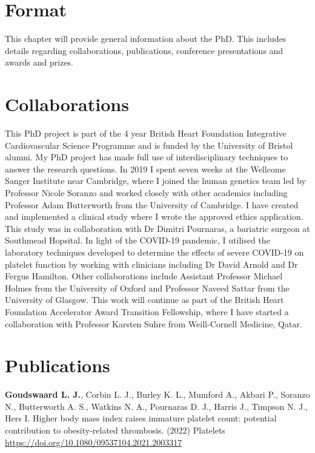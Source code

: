 \documentclass[11pt,twoside]{bristolthesis}
\begin{document}
\hypertarget{format}{%
\section{Format}\label{format}}

This chapter will provide general information about the PhD. This includes details regarding collaborations, publications, conference presentations and awards and prizes.

\hypertarget{collaborations}{%
\section{Collaborations}\label{collaborations}}

This PhD project is part of the 4 year British Heart Foundation Integrative Cardiovascular Science Programme and is funded by the University of Bristol alumni. My PhD project has made full use of interdisciplinary techniques to answer the research questions. In 2019 I spent seven weeks at the Wellcome Sanger Institute near Cambridge, where I joined the human genetics team led by Professor Nicole Soranzo and worked closely with other academics including Professor Adam Butterworth from the University of Cambridge. I have created and implemented a clinical study where I wrote the approved ethics application. This study was in collaboration with Dr Dimitri Pournaras, a bariatric surgeon at Southmead Hopsital. In light of the COVID-19 pandemic, I utilised the laboratory techniques developed to determine the effects of severe COVID-19 on platelet function by working with clinicians including Dr David Arnold and Dr Fergus Hamilton. Other collaborations include Assistant Professor Michael Holmes from the University of Oxford and Professor Naveed Sattar from the University of Glasgow. This work will continue as part of the British Heart Foundation Accelerator Award Transition Fellowship, where I have started a collaboration with Professor Karsten Suhre from Weill-Cornell Medicine, Qatar.

\hypertarget{publications}{%
\section{Publications}\label{publications}}

\textbf{Goudswaard L. J.}, Corbin L. J., Burley K. L., Mumford A., Akbari P., Soranzo N., Butterworth A. S., Watkins N. A., Pournaras D. J., Harris J., Timpson N. J., Hers I. Higher body mass index raises immature platelet count: potential contribution to obesity-related thrombosis. (2022) Platelets \url{https://doi.org/10.1080/09537104.2021.2003317}
\end{document}
